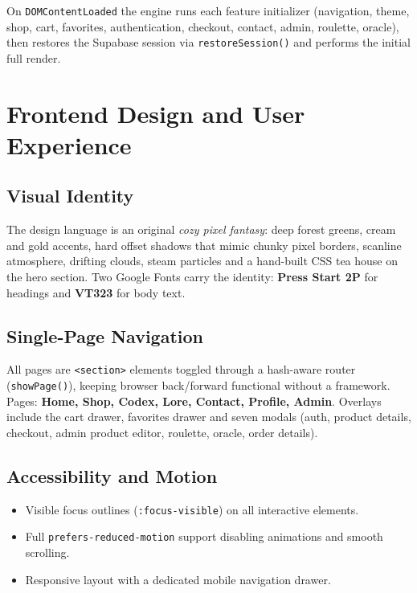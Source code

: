 \documentclass[11pt,a4paper]{article}
\begin{document}
On \texttt{DOMContentLoaded} the engine runs each feature initializer
(navigation, theme, shop, cart, favorites, authentication, checkout,
contact, admin, roulette, oracle), then restores the Supabase session via
\texttt{restoreSession()} and performs the initial full render.


\section{Frontend Design and User Experience}

\subsection{Visual Identity}

The design language is an original \emph{cozy pixel fantasy}: deep forest
greens, cream and gold accents, hard offset shadows that mimic chunky pixel
borders, scanline atmosphere, drifting clouds, steam particles and a
hand-built CSS tea house on the hero section. Two Google Fonts carry the
identity: \textbf{Press Start 2P} for headings and \textbf{VT323} for body
text.

\subsection{Single-Page Navigation}

All pages are \texttt{<section>} elements toggled through a hash-aware
router (\texttt{showPage()}), keeping browser back/forward functional
without a framework. Pages: \textbf{Home, Shop, Codex, Lore, Contact,
Profile, Admin}. Overlays include the cart drawer, favorites drawer and
seven modals (auth, product details, checkout, admin product editor,
roulette, oracle, order details).

\subsection{Accessibility and Motion}

\begin{itemize}[nosep]
    \item Visible focus outlines (\texttt{:focus-visible}) on all
          interactive elements.
    \item Full \texttt{prefers-reduced-motion} support disabling
          animations and smooth scrolling.
    \item Responsive layout with a dedicated mobile navigation drawer.
\end{itemize}
\end{document}
